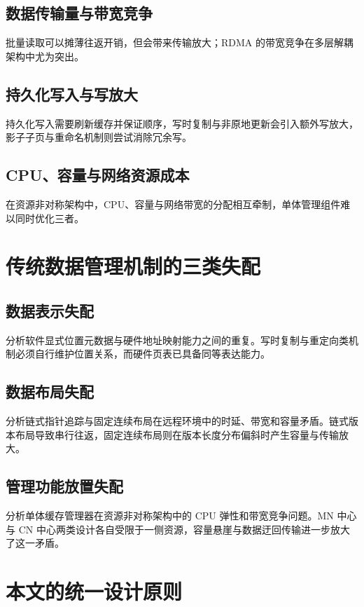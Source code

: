 \subsection{数据传输量与带宽竞争}
批量读取可以摊薄往返开销，但会带来传输放大\cite{caiEfficient2018,weiCharacterizing2021}；RDMA 的带宽竞争在多层解耦架构中尤为突出\cite{guoRdma2016}。
\subsection{持久化写入与写放大}
持久化写入需要刷新缓存并保证顺序，写时复制与非原地更新会引入额外写放大\cite{liuDudetm2017,caiHoop2020,niSsp2019}，影子子页与重命名机制则尝试消除冗余写\cite{niSsp2019,bhattacharyyaNvmr2022}。
\subsection{CPU、容量与网络资源成本}
在资源非对称架构中，CPU、容量与网络带宽的分配相互牵制，单体管理组件难以同时优化三者\cite{caoPolardb2021,zhangTowards2021,liPond2023}。

\section{传统数据管理机制的三类失配}
\subsection{数据表示失配}
分析软件显式位置元数据与硬件地址映射能力之间的重复。写时复制与重定向类机制必须自行维护位置关系\cite{liuDudetm2017,marmolLibpm2018,liCtfs2022}，而硬件页表已具备同等表达能力。
\subsection{数据布局失配}
分析链式指针追踪与固定连续布局在远程环境中的时延、带宽和容量矛盾。链式版本布局导致串行往返\cite{zhangMotor2024}，固定连续布局则在版本长度分布偏斜时产生容量与传输放大\cite{zhangMotor2024,binnigEnd2016}。
\subsection{管理功能放置失配}
分析单体缓存管理器在资源非对称架构中的 CPU 弹性和带宽竞争问题。MN 中心与 CN 中心两类设计各自受限于一侧资源\cite{caoPolardb2021,verbitskiAmazon2017}，容量悬崖与数据迂回传输进一步放大了这一矛盾\cite{zhangTowards2021,ruanPersistent2023}。

\section{本文的统一设计原则}
